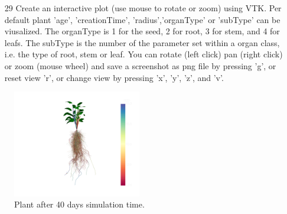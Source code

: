 \begin{itemize}
 \item[29] Create an interactive plot (use mouse to rotate or zoom) using VTK. Per default plant 'age', 'creationTime', 'radius','organType' or 'subType' can be viusalized. The organType is 1 for the seed, 2 for root, 3 for stem, and 4 for leafs. The subType is the number of the parameter set within a organ class, i.e. the type of root, stem or leaf. You can rotate (left click) pan (right click) or zoom (mouse wheel) and save a screenshot as png file by pressing 'g', or reset view 'r', or change view by pressing 'x', 'y', 'z', and 'v'.
 \end{itemize}
  
\begin{figure}
\centering
\includegraphics[width=0.5\textwidth]{examples/results/intro_basic.png} 
\caption{Plant after 40 days simulation time.} \label{fig:intro_basic}
\end{figure}  
